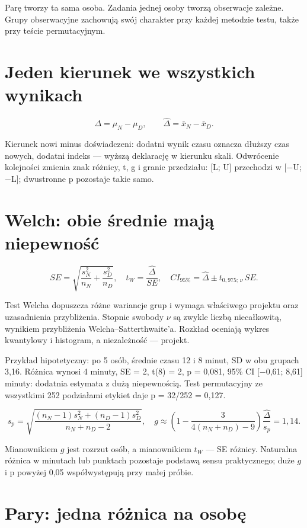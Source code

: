 \documentclass[
  polish,
  11pt,
  a4paper,
]{article}
\begin{document}
Parę tworzy ta sama osoba. Zadania jednej osoby tworzą obserwacje
zależne. Grupy obserwacyjne zachowują swój charakter przy każdej
metodzie testu, także przy teście permutacyjnym.

\section{Jeden kierunek we wszystkich
wynikach}\label{jeden-kierunek-we-wszystkich-wynikach}

\[\Delta=\mu_N-\mu_D,\qquad
\widehat\Delta=\bar{x}_N-\bar{x}_D.\]

Kierunek nowi minus doświadczeni: dodatni wynik czasu oznacza dłuższy
czas nowych, dodatni indeks --- wyższą deklarację w kierunku skali.
Odwrócenie kolejności zmienia znak różnicy, t, g i granic przedziału:
{[}L; U{]} przechodzi w {[}−U; −L{]}; dwustronne p pozostaje takie samo.

\section{Welch: obie średnie mają
niepewność}\label{welch-obie-ux15brednie-majux105-niepewnoux15bux107}

\[
SE=\sqrt{\frac{s_N^2}{n_N}+\frac{s_D^2}{n_D}},
\quad t_W=\frac{\widehat\Delta}{SE},
\quad CI_{95\%}=\widehat\Delta\pm t_{0{,}975;\,\nu}\,SE.
\]

Test Welcha dopuszcza różne wariancje grup i wymaga właściwego projektu
oraz uzasadnienia przybliżenia. Stopnie swobody \(\nu\) są zwykle liczbą
niecałkowitą, wynikiem przybliżenia Welcha--Satterthwaite'a. Rozkład
oceniają wykres kwantylowy i histogram, a niezależność --- projekt.

Przykład hipotetyczny: po 5 osób, średnie czasu 12 i 8 minut, SD w obu
grupach 3,16. Różnica wynosi 4 minuty, SE = 2, t(8) = 2, p = 0,081, 95\%
CI {[}−0,61; 8,61{]} minuty: dodatnia estymata z dużą niepewnością. Test
permutacyjny ze wszystkimi 252 podziałami etykiet daje p = 32/252 =
0,127.

\[
s_p=\sqrt{\frac{(n_N-1)s_N^2+(n_D-1)s_D^2}{n_N+n_D-2}},
\quad
g\approx\left(1-\frac{3}{4(n_N+n_D)-9}\right)
\frac{\widehat\Delta}{s_p}=1{,}14 .
\]

Mianownikiem \(g\) jest rozrzut osób, a mianownikiem \(t_W\) --- SE
różnicy. Naturalna różnica w minutach lub punktach pozostaje podstawą
sensu praktycznego; duże \(g\) i p powyżej 0,05 współwystępują przy
małej próbie.

\section{Pary: jedna różnica na
osobę}\label{pary-jedna-ruxf3ux17cnica-na-osobux119}
\end{document}
